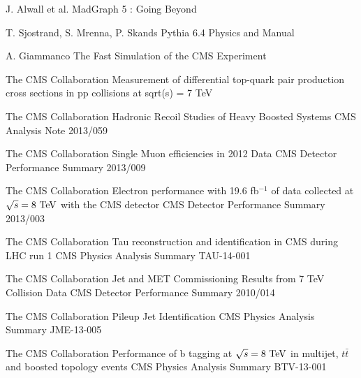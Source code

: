 \begin{thebibliography}{2}
             {J. Alwall et al.}
             {MadGraph 5 : Going Beyond}
             {}

             {T. Sjostrand, S. Mrenna, P. Skands}
             {Pythia 6.4 Physics and Manual}
             {}

             {A. Giammanco}
             {The Fast Simulation of the CMS Experiment}
             {}

             {The CMS Collaboration}
             {Measurement of differential top-quark pair production
             cross sections in pp collisions at sqrt(s) = 7 TeV}
             {}

             {The CMS Collaboration}
             {Hadronic Recoil Studies of Heavy Boosted Systems}
             {CMS Analysis Note 2013/059}


             {The CMS Collaboration}
             {Single Muon efficiencies in 2012 Data}
             {CMS Detector Performance Summary 2013/009}

             {The CMS Collaboration}
             {Electron performance with 19.6 fb$^{-1}$ of data collected at $\sqrt{s}=8~\text{TeV}$ with the CMS detector}
             {CMS Detector Performance Summary 2013/003}

             {The CMS Collaboration}
             {Tau reconstruction and identification in CMS during LHC run 1}
             {CMS Physics Analysis Summary TAU-14-001}

             {The CMS Collaboration}
             {Jet and MET Commissioning Results from 7 TeV Collision Data}
             {CMS Detector Performance Summary 2010/014}

             {The CMS Collaboration}
             {Pileup Jet Identification}
             {CMS Physics Analysis Summary JME-13-005}

             {The CMS Collaboration}
             {Performance of b tagging at $\sqrt{s} = 8~\text{TeV}$ in multijet, $t\bar{t}$ and
             boosted topology events}
             {CMS Physics Analysis Summary BTV-13-001}


\end{thebibliography}

